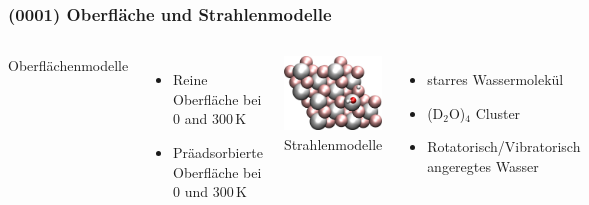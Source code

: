 \documentclass[hyperref={pdfpagelabels=false}]{beamer}
\begin{document}
\begin{frame}
 \frametitle{(0001) Oberfläche und Strahlenmodelle}
 \begin{columns}
  Oberflächenmodelle
  \begin{itemize}
   \item Reine Oberfläche bei $0$ and $300\,$K
   \item Präadsorbierte Oberfläche bei $0$ und $300\,$K
  \end{itemize} 
  \centering
\includegraphics[width=1.\textwidth]{figures/0001_1-2-diss_top.jpg}
\newline
\pause
  Strahlenmodelle
  \begin{itemize}
   \item starres Wassermolekül
   \item (D$_2$O)$_4$ Cluster
   \item Rotatorisch/Vibratorisch angeregtes Wasser
  \end{itemize}
   \centering
 \includegraphics[width=0.5\textwidth]{figures/perspective+h2o_new.png}
\end{columns}
\end{frame}
\end{document}
